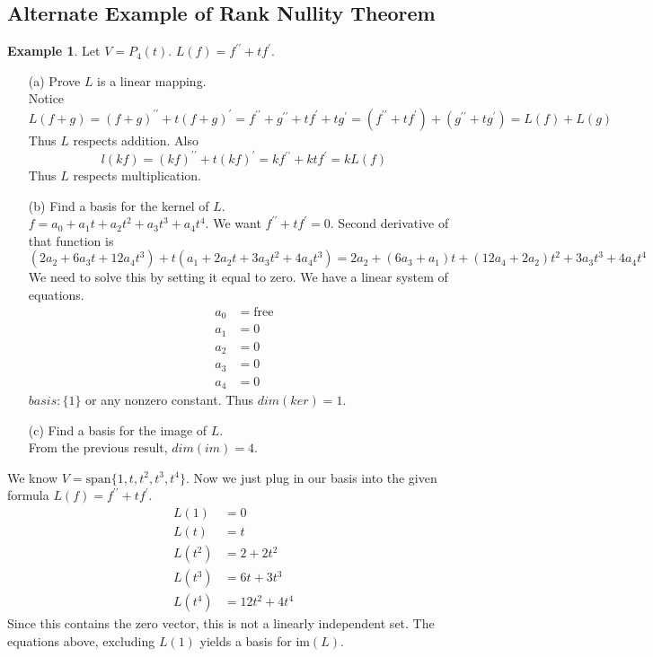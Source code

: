 \documentclass{report}
\theoremstyle{plain}
\theoremstyle{definition}
\newtheorem*{ex}{Example}
\theoremstyle{plain}
\begin{document}
\subsection{Alternate Example of Rank Nullity Theorem}
\begin{ex}
Let $V=P_4(t)$. $L(f)=f^{\prime\prime} + tf^\prime$.
\begin{enumerate}
\item[(a)] Prove $L$ is a linear mapping.\\
Notice 
\[ L(f+g) = (f+g)^{\prime\prime} + t(f+g)^\prime = f^{\prime\prime} + g^{\prime\prime} + tf^\prime + tg^\prime = (f^{\prime\prime}+tf^\prime)+(g^{\prime\prime}+tg^\prime) = L(f) + L(g) \] 
Thus $L$ respects addition. Also
\[ l(kf) = (kf)^{\prime\prime}+t(kf)^\prime = kf^{\prime\prime}+ktf^\prime = kL(f) \] 
Thus $L$ respects multiplication.
\item[(b)] Find a basis for the kernel of $L$.\\
$f=a_0+a_1t+a_2t^2+a_3t^3+a_4t^4$. We want $f^{\prime\prime}+tf^\prime = 0$. Second derivative of that function is
\[ (2a_2+6a_3t+12a_4t^3) + t(a_1+2a_2t+3a_3t^2+4a_4t^3) = 2a_2+(6a_3+a_1)t+(12a_4+2a_2)t^2+3a_3t^3+4a_4t^4 \]
We need to solve this by setting it equal to zero. We have a linear system of equations.\\
\begin{align*}
a_0&=\mathrm{free}\\
a_1&=0\\
a_2&=0\\
a_3&=0\\
a_4&=0
\end{align*}
$basis:\{1\}$ or any nonzero constant. Thus $dim(ker)=1$.
\item[(c)] Find a basis for the image of $L$.\\
From the previous result, $dim(im)=4$.
\end{enumerate}
We know $V=\mathrm{span}\{1,t,t^2,t^3,t^4\}$. Now we just plug in our basis into the given formula $L(f)=f^{\prime\prime}+tf^\prime$.
\begin{align*}
L(1)&=0\\
L(t)&=t\\
L(t^2)&=2+2t^2\\
L(t^3)&=6t+3t^3\\
L(t^4)&=12t^2+4t^4
\end{align*}
Since this contains the zero vector, this is not a linearly independent set. The equations above, excluding $L(1)$ yields a basis for $\mathrm{im}(L)$. 
\end{ex}
\end{document}
